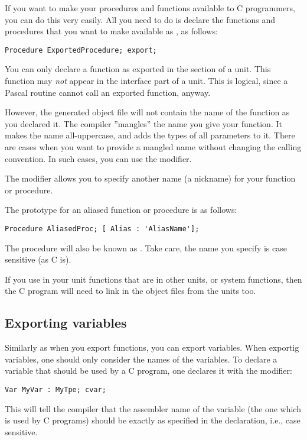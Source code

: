 If you want to make your procedures and functions available to C
programmers, you can do this very easily. All you need to do is declare the
functions and procedures that you want to make available as , as
follows:
\begin{verbatim}
Procedure ExportedProcedure; export;
\end{verbatim}

\begin{remark}You can only declare a function as exported in the
 section of a unit. This function may {\em not} appear
in the interface part of a unit. This is logical, since a Pascal routine
cannot call an exported function, anyway.
\end{remark}
However, the generated object file will not contain the name of the function
as you declared it. The \fpc compiler ''mangles'' the name you give your
function. It makes the name all-uppercase, and adds the types of all
parameters to it. There are cases when you want to provide a mangled name
without changing the calling convention. In such cases, you can use the
 modifier.

The  modifier allows you to specify
another name (a nickname) for your function or procedure.

The prototype for an aliased function or procedure is as follows:
\begin{verbatim}
Procedure AliasedProc; [ Alias : 'AliasName'];
\end{verbatim}
The procedure  will also be known as . Take
care, the name you specify is case sensitive (as C is).

\begin{remark}If you use in your unit functions that are in other units, or
system functions, then the C program will need to link in the object files
from the units too.
\end{remark}
\subsection{Exporting variables}
Similarly as when you export functions, you can export variables.
When exportig variables, one should only consider the names of the
variables. To declare a variable that should be used by a C program,
one declares it with the  modifier:
\begin{verbatim}
Var MyVar : MyTpe; cvar;
\end{verbatim}
This will tell the compiler that the assembler name of the variable (the one
which is used by C programs) should be exactly as specified in the
declaration, i.e., case sensitive.

